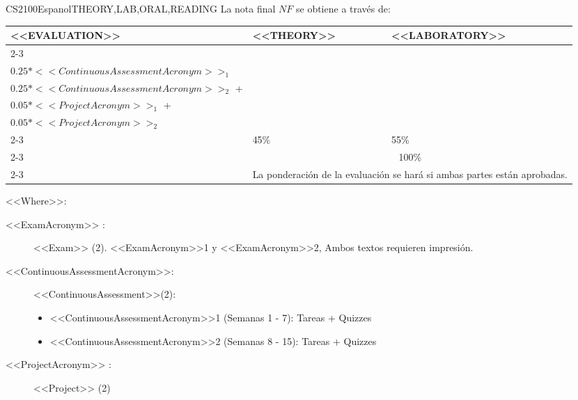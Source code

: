  \begin{evaluation}{CS2100}{Espanol}{THEORY,LAB,ORAL,READING}
  La nota final $NF$ se obtiene a través de:

  \begin{tabularx}{0.9\textwidth}{|X|p{}|p{}|} \hline
    \multirow{4}{*}{\uppercase{<<Evaluation>>}} & \uppercase{<<Theory>>} & \uppercase{<<Laboratory>>} \\ \cline{2-3}
    & %
        \begin{minipage}{0.95\textwidth}
        \begin{tabular}{l}
            $0.20*<<ExamAcronym>>_{1}$  + \\
            $0.25*<<ContinuousAssessmentAcronym>>_{1}$
            \end{tabular} 
        \end{minipage} 
    & %
        \begin{minipage}{0.95\textwidth}
        \begin{tabular}{l}
            $0.20*<<ExamAcronym>>_{1}$  + \\
            $0.25*<<ContinuousAssessmentAcronym>>_{2}$  +\\
            $0.05*<<ProjectAcronym>>_{1}$ + \\
            $0.05*<<ProjectAcronym>>_{2}$
            \end{tabular} 
        \end{minipage}                 \\ \cline{2-3}
    
    & %
    45\% 
    & %
    55\% \\ \cline{2-3}
    & \multicolumn{2}{|c|}{100\%}  \\ \cline{2-3}
    & \multicolumn{2}{|c|}{La ponderación de la evaluación se hará si ambas partes están aprobadas.}  \\ \hline
    \end{tabularx}
    
    \vspace{2mm}
    \noindent <<Where>>:
    \begin{description}
        \item[<<ExamAcronym>> :] <<Exam>> (2). <<ExamAcronym>>1 y <<ExamAcronym>>2, Ambos textos requieren impresión.
        \item[<<ContinuousAssessmentAcronym>>:]<<ContinuousAssessment>>(2):
        \begin{itemize}
                \item <<ContinuousAssessmentAcronym>>1 (Semanas 1 - 7): Tareas + Quizzes
                \item <<ContinuousAssessmentAcronym>>2 (Semanas 8 - 15): Tareas + Quizzes
        \end{itemize}
        \item[<<ProjectAcronym>> :] <<Project>> (2)
    \end{description}


\end{evaluation}
